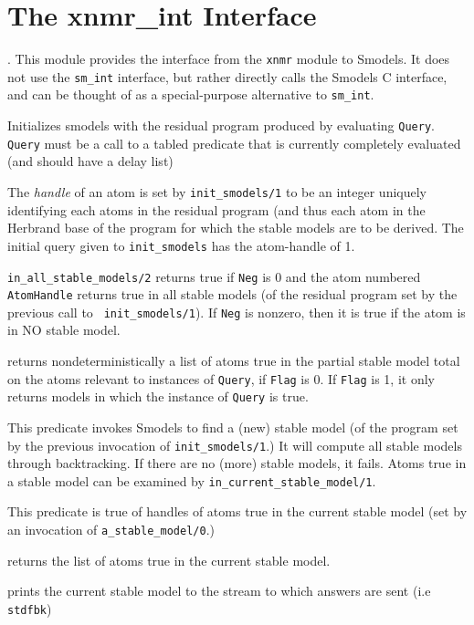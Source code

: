 \section{The xnmr\_int Interface}.
%
This module provides the interface from the {\tt xnmr} module to
Smodels.  It does not use the {\tt sm\_int} interface, but rather
directly calls the Smodels C interface, and can be thought of as a
special-purpose alternative to {\tt sm\_int}.
%
\begin{description}
%
Initializes smodels with the residual program produced by evaluating
{\tt Query}.  {\tt Query} must be a call to a tabled predicate that is
currently completely evaluated (and should have a delay list)

% 
The {\em handle} of an atom is set by {\tt init\_smodels/1} to be an
integer uniquely identifying each atoms in the residual program (and
thus each atom in the Herbrand base of the program for which the
stable models are to be derived.  The initial query given to
{\tt init\_smodels} has the atom-handle of 1.

%
{\tt in\_all\_stable\_models/2} returns true if {\tt Neg} is 0 and the
atom numbered {\tt AtomHandle} returns true in all stable models (of
the residual program set by the previous call to {\tt
  init\_smodels/1}).  If {\tt Neg} is nonzero, then it is true if the
atom is in NO stable model.

%
returns nondeterministically a list of atoms true in the partial
stable model total on the atoms relevant to instances of {\tt Query},
if {\tt Flag} is 0.  If {\tt Flag} is 1, it only returns models in
which the instance of {\tt Query} is true.

%
This predicate invokes Smodels to find a (new) stable model (of the
program set by the previous invocation of {\tt init\_smodels/1}.)  It
will compute all stable models through backtracking.  If there are no
(more) stable models, it fails.  Atoms true in a stable model can be
examined by {\tt in\_current\_stable\_model/1}.

%
This predicate is true of handles of atoms true in the current stable
model (set by an invocation of {\tt a\_stable\_model/0}.)

%
returns the list of atoms true in the current stable model.

%
prints the current stable model to the stream to which answers are
sent (i.e {\tt stdfbk})

\end{description}
